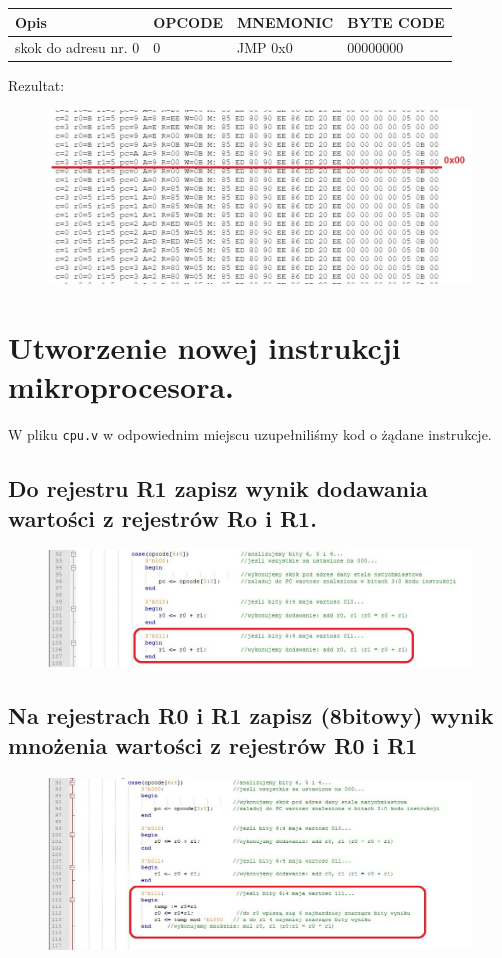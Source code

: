 \documentclass[12pt,a4paper]{article}
\begin{document}
	\begin{table}[!ht]
		\centering
		\begin{tabular}{l|l|l|l}
		Opis                 & OPCODE & MNEMONIC & BYTE CODE \\ \hline
		skok do adresu nr. 0 & 0      & JMP 0x0  & 00000000 
		\end{tabular}
		\end{table}
	Rezultat:
	
	\begin{figure}[!ht]
		\centering
		\includegraphics[width=1\linewidth]{graphics/log7}
	\end{figure}
	
	
		\newpage
	
	\section{Utworzenie nowej instrukcji mikroprocesora.}
	W pliku \texttt{cpu.v} w odpowiednim miejscu uzupełniliśmy kod o żądane instrukcje.
	\subsection{Do rejestru R1 zapisz wynik dodawania wartości z rejestrów Ro i R1.}
	\begin{figure}[!ht]
		\centering
		\includegraphics[width=1\linewidth]{graphics/code1}
	\end{figure}

	\subsection{Na rejestrach R0 i R1 zapisz (8bitowy) wynik mnożenia wartości z rejestrów R0 i R1}
	\begin{figure}[!ht]
		\centering
		\includegraphics[width=1\linewidth]{graphics/code2}
	\end{figure}
\end{document}
